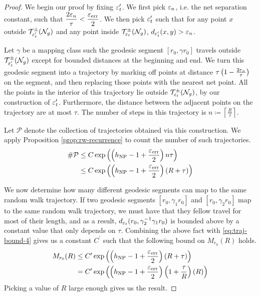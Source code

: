 \begin{proof}
  We begin our proof by fixing $\varepsilon_t^{\prime}$.
  We first pick $\varepsilon_n$, i.e. the net separation constant, such that $\displaystyle \frac{2\varepsilon_n}{\tau} < \frac{\varepsilon_{\mathrm{err}}}{2}$.
  We then pick $\varepsilon_t^{\prime}$ such that for any point $x$ outside $\mathcal{T}_{\varepsilon_t^{\prime}}^{\pm}(\mathcal{N}_g)$ and any point inside $\mathcal{T}_{\varepsilon_t}^{\pm}(\mathcal{N}_g)$, $d_{\varepsilon_t^{\prime}}(x, y) > \varepsilon_n$.

  Let $\gamma$ be a mapping class such the geodesic segment $[r_0, \gamma r_0]$ travels outside $\mathcal{T}_{\varepsilon_t^{\prime}}^{\pm}(\mathcal{N}_g)$ except for bounded distances at the beginning and end.
  We turn this geodesic segment into a trajectory by marking off points at distance $\tau\left( 1 - \frac{2\varepsilon_n}{\tau} \right)$ on the segment, and then replacing those points with the nearest net point.
  All the points in the interior of this trajectory lie outside $\mathcal{T}_{\varepsilon_t}^{\pm}(\mathcal{N}_g)$, by our construction of $\varepsilon_t^{\prime}$.
  Furthermore, the distance between the adjacent points on the trajectory are at most $\tau$.
  The number of steps in this trajectory is $\displaystyle n \coloneqq \left\lceil \frac{R}{\tau} \right\rceil$.

  Let $\mathcal{P}$ denote the collection of trajectories obtained via this construction.
  We apply Proposition \ref{prop:rw-recurrence} to count the number of such trajectories.
  \begin{align}
    \# \mathcal{P} &\leq C \exp\left(\left(h_{\mathrm{NP}} - 1 + \frac{\varepsilon_{\mathrm{err}}}{2}\right) n\tau\right) \\
                   &\leq C \exp\left(\left(h_{\mathrm{NP}} - 1 + \frac{\varepsilon_{\mathrm{err}}}{2}\right) (R + \tau)\right) \label{eq:traj-bound-4}
  \end{align}

  We now determine how many different geodesic segments can map to the same random walk trajectory.
  If two geodesic segments $[r_0, \gamma_1 r_0]$ and $[r_0, \gamma_2 r_0]$ map to the same random walk trajectory, we must have that they fellow travel for most of their length, and as a result, $d_{\varepsilon_t}(r_0, \gamma_2^{-1} \gamma_1 r_0)$ is bounded above by a constant value that only depends on $\tau$.
  Combining the above fact with \eqref{eq:traj-bound-4} gives us a constant $C^{\prime}$ such that the following bound on $M_{r_0}(R)$ holds.
  \begin{align*}
    M_{r_0}(R) &\leq C^{\prime} \exp\left(\left(h_{\mathrm{NP}} - 1 + \frac{\varepsilon_{\mathrm{err}}}{2}\right) (R + \tau)\right) \\
    &= C^{\prime} \exp\left(\left(h_{\mathrm{NP}} - 1 + \frac{\varepsilon_{\mathrm{err}}}{2}\right) \left(1 + \frac{\tau}{R}\right) (R)\right)
  \end{align*}
  Picking a value of $R$ large enough gives us the result.
\end{proof}

